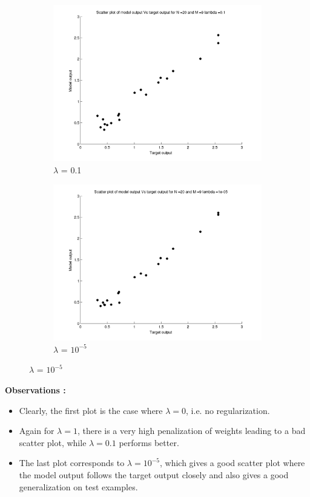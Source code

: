 \documentclass{article}
\begin{document}
\begin{figure}[H]
\begin{subfigure}{.5\textwidth}
\centering
\includegraphics[width=\linewidth]{Scatter_1/Varyinglambda_N20M9lambda01}
\caption{$\lambda$ = 0.1}
\end{subfigure}
\begin{subfigure}{.5\textwidth}
\includegraphics[width=\linewidth]{Scatter_1/Varyinglambda_N20M9lambda1e-05}
\caption{$\lambda$ = $10^{-5}$}
\end{subfigure}



\end{figure}

\textbf{Observations :}
\begin{itemize}
\item Clearly, the first plot is the case where $\lambda = 0$, i.e. no regularization.
\item Again for $\lambda = 1$, there is a very high penalization of weights leading to a bad scatter plot, while $\lambda = 0.1$ performs better.

\item The last plot corresponds to $\lambda = 10^{-5}$, which gives a good scatter plot where the model output follows the target output closely and also gives a good generalization on test examples.
\end{itemize}
\newpage
\end{document}
